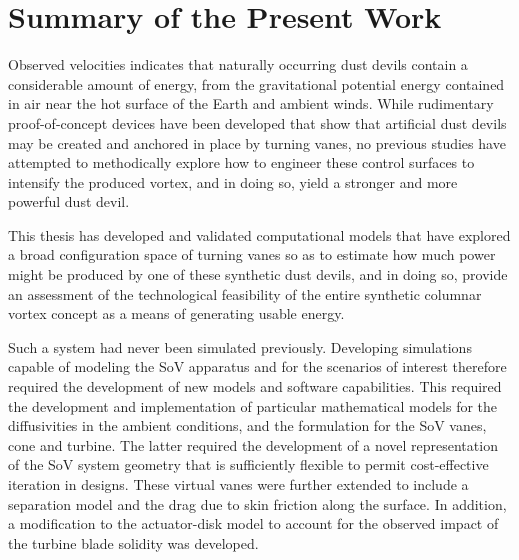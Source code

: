 \label{sec:conclusions}

%
%

%
%

\section{Summary of the Present Work}

%
%

%
%
%

Observed velocities indicates that naturally occurring dust devils
contain a considerable amount of energy, from the gravitational
potential energy contained in air near the hot surface of the Earth and
ambient winds. While rudimentary proof-of-concept devices have been
developed that show that artificial dust devils may be created and
anchored in place by turning vanes, no previous studies have attempted
to methodically explore how to engineer these control surfaces to
intensify the produced vortex, and in doing so, yield a stronger and
more powerful dust devil. 

This thesis has developed and validated computational models that have
explored a broad configuration space of turning vanes so as to estimate
how much power might be produced by one of these synthetic dust devils,
and in doing so, provide an assessment of the technological feasibility
of the entire synthetic columnar vortex concept as a means of generating
usable energy. 

Such a system had never been simulated previously. Developing
simulations capable of modeling the SoV apparatus and for the scenarios
of interest therefore required the development of new models and
software capabilities. This required the development and implementation
of particular mathematical models for the diffusivities in the ambient
conditions, and the formulation for the SoV vanes, cone and
turbine. The latter required the development of a novel representation
of the SoV system geometry that is sufficiently flexible to permit
cost-effective iteration in designs. These virtual vanes were
further extended to include a separation model and the drag due to skin
friction along the surface. In addition, a modification to the
actuator-disk model to account for the observed impact of the turbine
blade solidity was developed. 

